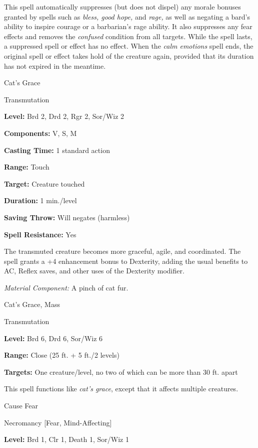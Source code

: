 \documentclass{article}
\begin{document}
This spell automatically suppresses (but does not dispel) any morale bonuses granted 
by spells such as \textit{bless, good hope, }and \textit{rage, }as well as negating 
a bard's ability to inspire courage or a barbarian's rage ability. It also suppresses 
any fear effects and removes the \textit{confused }condition from all targets\textit{. 
}While the spell lasts, a suppressed spell or effect has no effect. When the \textit{calm 
emotions }spell ends, the original spell or effect takes hold of the creature again, 
provided that its duration has not expired in the meantime.

\vspace{12pt}
Cat's Grace

Transmutation

\textbf{Level:} Brd 2, Drd 2, Rgr 2, Sor/Wiz 2

\textbf{Components:} V, S, M

\textbf{Casting Time:} 1 standard action

\textbf{Range:} Touch

\textbf{Target:} Creature touched

\textbf{Duration:} 1 min./level

\textbf{Saving Throw: }Will negates (harmless)

\textbf{Spell Resistance:} Yes

The transmuted creature becomes more graceful, agile, and coordinated. The spell 
grants a +4 enhancement bonus to Dexterity, adding the usual benefits to AC, Reflex 
saves, and other uses of the Dexterity modifier.

\textit{Material Component: }A pinch of cat fur.

\vspace{12pt}
Cat's Grace, Mass

Transmutation

\textbf{Level:} Brd 6, Drd 6, Sor/Wiz 6

\textbf{Range:} Close (25 ft. + 5 ft./2 levels)

\textbf{Targets:} One creature/level, no two of which can be more than 30 ft. apart

This spell functions like \textit{cat's grace}, except that it affects multiple 
creatures.

\vspace{12pt}
Cause Fear

Necromancy [Fear, Mind-Affecting]

\textbf{Level:} Brd 1, Clr 1, Death 1, Sor/Wiz 1
\end{document}
